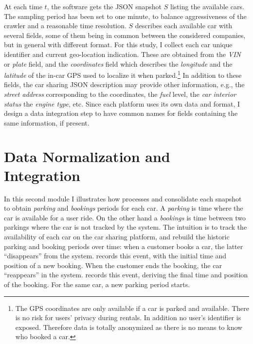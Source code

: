 At each time $t$, the software gets the JSON snapshot $S$ listing the available cars. 
The sampling period has been set to one minute, to balance aggressiveness of the crawler and a reasonable time resolution.
$S$ describes each available car with several fields, some of them being in common between the considered companies, but in general with different format.
For this study, I collect each car unique identifier and current geo-location indication.
These are obtained from the \textit{VIN} or \textit{plate} field, and the \textit{coordinates} field which describes the \textit{longitude} and the \textit{latitude} of the in-car GPS used to localize it when  parked.\footnote{The GPS coordinates are only available if a car is parked and available. There is no risk for users' privacy during rentals. In addition no user's identifier is exposed. Therefore data is totally anonymized as there is no means to know who booked a car.}
In addition to these fields, the car sharing JSON description may provide other information, e.g., the \textit{street address} corresponding to the coordinates, the \textit{fuel} level, the \textit{car interior status} the \textit{engine type}, etc. Since each platform uses its own data and format, I design a data integration step to have common names for fields containing the same information, if present.

\section{Data Normalization and Integration}
\label{sec:2_4_data_normalization}
In this second module I illustrates how \tool processes and consolidate each snapshot to obtain \emph{parking} and \emph{bookings} periods for each car. A \emph{parking} is time where the car is available for a user ride. On the other hand a \emph{bookings} is time between two parkings where the car is not tracked by the system. The intuition is to track the availability of each car on the car sharing platform, and rebuild the historic parking and booking periods over time: when a customer books a car, the latter ``disappears'' from the system. \tool records this event, with the initial time and position of a new booking. When the customer ends the booking, the car ``reappears'' in the system. \tool records this event, deriving the final time and position of the booking. For the same car, a new parking period starts.

